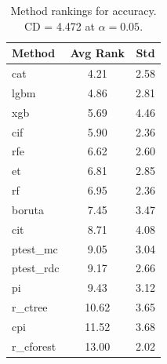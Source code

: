 \begin{table}[h]
\centering
\caption{Method rankings for accuracy. CD = 4.472 at $\alpha=0.05$.}
\label{tab:ranks_accuracy}
\begin{tabular}{lcc}
\toprule
Method & Avg Rank & Std \\
\midrule
cat & 4.21 & 2.58 \\
lgbm & 4.86 & 2.81 \\
xgb & 5.69 & 4.46 \\
cif & 5.90 & 2.36 \\
rfe & 6.62 & 2.60 \\
et & 6.81 & 2.85 \\
rf & 6.95 & 2.36 \\
boruta & 7.45 & 3.47 \\
cit & 8.71 & 4.08 \\
ptest_mc & 9.05 & 3.04 \\
ptest_rdc & 9.17 & 2.66 \\
pi & 9.43 & 3.12 \\
r_ctree & 10.62 & 3.65 \\
cpi & 11.52 & 3.68 \\
r_cforest & 13.00 & 2.02 \\
\bottomrule
\end{tabular}
\end{table}